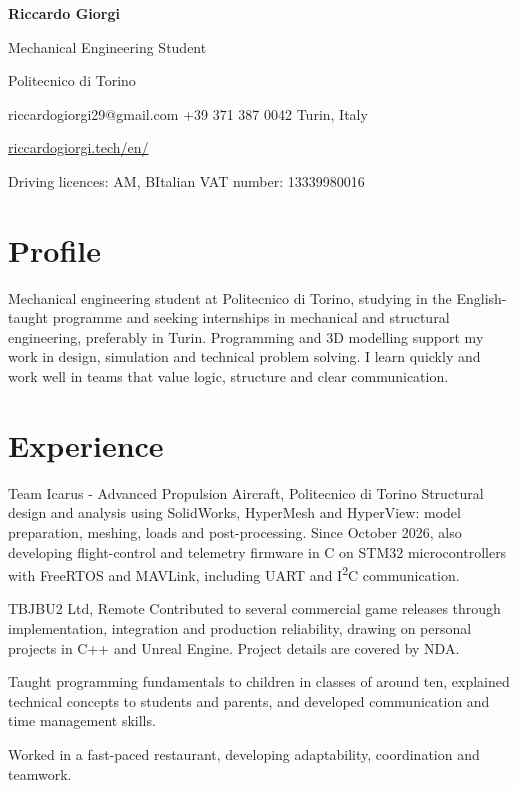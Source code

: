 \documentclass[a4paper,10pt]{article}
\begin{document}
{\Huge\bfseries Riccardo Giorgi}\par
{\large Mechanical Engineering Student}\par
{\color{muted}Politecnico di Torino}\par
riccardogiorgi29@gmail.com
\enspace\textbullet\enspace +39 371 387 0042
\enspace\textbullet{} Turin, Italy\par
\url{riccardogiorgi.tech/en/}\par
{\small Driving licences: AM, B\enspace\textbullet\enspace Italian VAT number: 13339980016}

\section*{Profile}
Mechanical engineering student at Politecnico di Torino, studying in the
English-taught programme and seeking internships in mechanical and structural
engineering, preferably in Turin. Programming and 3D modelling support my work
in design, simulation and technical problem solving. I learn quickly and work
well in teams that value logic, structure and clear communication.

\section*{Experience}
  {Team Icarus - Advanced Propulsion Aircraft, Politecnico di Torino}
  {Structural design and analysis using SolidWorks, HyperMesh and HyperView:
  model preparation, meshing, loads and post-processing. Since October 2026,
  also developing flight-control and telemetry firmware in C on STM32
  microcontrollers with FreeRTOS and MAVLink, including UART and I\textsuperscript{2}C communication.}

  {TBJBU2 Ltd, Remote}
  {Contributed to several commercial game releases through implementation,
  integration and production reliability, drawing on personal projects in C++
  and Unreal Engine. Project details are covered by NDA.}

  {Taught programming fundamentals to children in classes of around ten,
  explained technical concepts to students and parents, and developed
  communication and time management skills.}

  {Worked in a fast-paced restaurant, developing adaptability, coordination
  and teamwork.}
\end{document}
